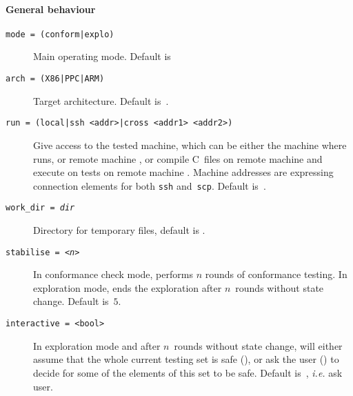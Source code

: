 \paragraph*{General behaviour}
\begin{description}
\item[{\tt mode = (conform|explo)}]
Main operating mode. Default is~
\item[{\tt arch = (X86|PPC|ARM)}]
Target architecture. Default is~.
\item[{\tt run = (local|ssh <addr>|cross <addr1> <addr2>)}]
Give access to the tested machine,
which can be either the machine where \dont{} runs,
or remote machine ,
or compile C~files on remote machine  and execute on
tests on remote machine .
Machine addresses are  expressing
connection elements for both \texttt{ssh} and~\texttt{scp}.
Default is~.

\item[{\tt work\_dir = \textit{dir}}]
Directory for temporary files, default is .
\item[{\tt stabilise = <\textit{n}>}]
In conformance check mode, \dont{} performs $n$ rounds of conformance testing.
In exploration mode, \dont{} ends the exploration after $n$~rounds
without state change. Default is~$5$.
\item[{\tt interactive = <bool>}]
In exploration mode and after $n$~rounds
without state change, \dont{} will either assume that the whole current
testing set is safe (), or ask the user () to
decide for some of the elements of this set to be safe.
Default is~, \emph{i.e.} ask user.
\end{description}

